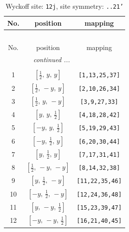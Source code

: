 \documentclass[fleqn,8pt]{jsarticle}
\begin{document}
\begin{longtable}{ccc}
\caption{Wyckoff site: {\tt 12j}, site symmetry: {\tt ..21'}}
 \\
 \hline \hline
No. & position & mapping \\ \hline \endfirsthead

\multicolumn{2}{l}{\tablename\ \thetable{}} \\
 \hline \hline
No. & position & mapping \\ \hline \endhead

 \hline \hline
\multicolumn{2}{r}{\footnotesize\it continued ...} \\ \endfoot

 \hline \hline
\multicolumn{2}{r}{} \\ \endlastfoot

1 & $\left[ \frac{1}{2},\, y,\, y \right]$ & {\tt [1,13,25,37]} \\ \hline
2 & $\left[ \frac{1}{2},\, - y,\, y \right]$ & {\tt [2,10,26,34]} \\ \hline
3 & $\left[ \frac{1}{2},\, y,\, - y \right]$ & {\tt [3,9,27,33]} \\ \hline
4 & $\left[ y,\, y,\, \frac{1}{2} \right]$ & {\tt [4,18,28,42]} \\ \hline
5 & $\left[ - y,\, y,\, \frac{1}{2} \right]$ & {\tt [5,19,29,43]} \\ \hline
6 & $\left[ - y,\, \frac{1}{2},\, y \right]$ & {\tt [6,20,30,44]} \\ \hline
7 & $\left[ y,\, \frac{1}{2},\, y \right]$ & {\tt [7,17,31,41]} \\ \hline
8 & $\left[ \frac{1}{2},\, - y,\, - y \right]$ & {\tt [8,14,32,38]} \\ \hline
9 & $\left[ y,\, \frac{1}{2},\, - y \right]$ & {\tt [11,22,35,46]} \\ \hline
10 & $\left[ - y,\, \frac{1}{2},\, - y \right]$ & {\tt [12,24,36,48]} \\ \hline
11 & $\left[ y,\, - y,\, \frac{1}{2} \right]$ & {\tt [15,23,39,47]} \\ \hline
12 & $\left[ - y,\, - y,\, \frac{1}{2} \right]$ & {\tt [16,21,40,45]} \\
\end{longtable}
\renewcommand{\arraystretch}{1.2}
\end{document}
